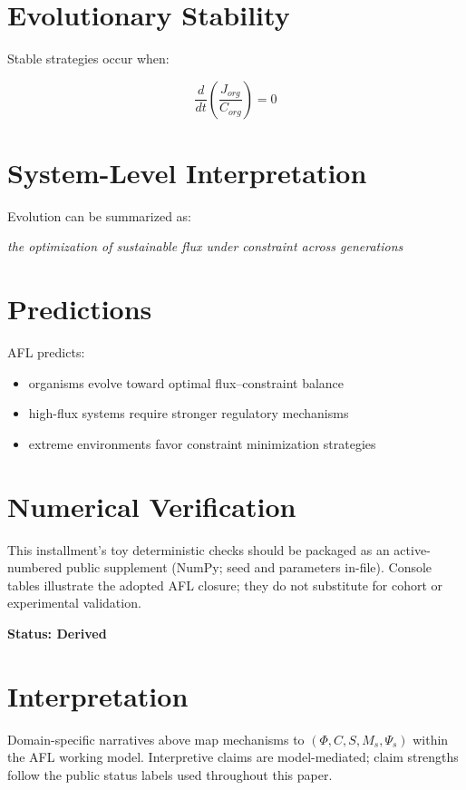 \documentclass[11pt]{article}
\begin{document}
\section{Evolutionary Stability}

Stable strategies occur when:

\begin{equation}
\frac{d}{dt} \left( \frac{J_{org}}{C_{org}} \right) = 0
\end{equation}

\section{System-Level Interpretation}

Evolution can be summarized as:

\begin{center}
\textit{the optimization of sustainable flux under constraint across generations}
\end{center}

\section{Predictions}

AFL predicts:

\begin{itemize}
    \item organisms evolve toward optimal flux–constraint balance
    \item high-flux systems require stronger regulatory mechanisms
    \item extreme environments favor constraint minimization strategies
\end{itemize}

\section{Numerical Verification}
This installment's toy deterministic checks should be packaged as an active-numbered public supplement (NumPy; seed and parameters in-file). Console tables illustrate the adopted AFL closure; they do not substitute for cohort or experimental validation.

\textbf{Status: Derived}

\section{Interpretation}
Domain-specific narratives above map mechanisms to $(\Phi, C, S, M_s, \Psi_s)$ within the AFL working model. Interpretive claims are model-mediated; claim strengths follow the public status labels used throughout this paper.
\end{document}
